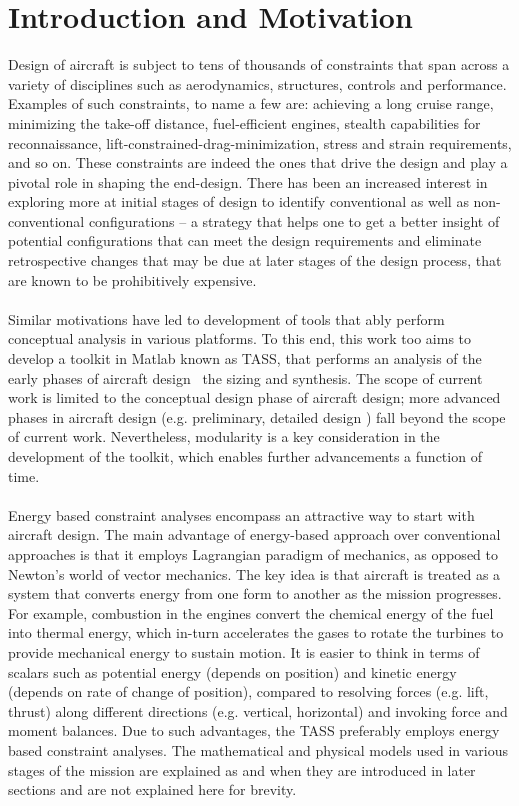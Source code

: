\documentclass[pdftex,11pt,letter]{article}
\begin{document}
\section{Introduction and Motivation}

Design of aircraft is subject to tens of thousands of constraints that span across a variety of disciplines such as aerodynamics, structures, controls and performance\cite{NicolaiText,FieldingText,HoweText,RaymerText}. Examples of such constraints, to name a few are: achieving a long cruise range, minimizing the take-off distance, fuel-efficient engines, stealth capabilities for reconnaissance, lift-constrained-drag-minimization, stress and strain requirements, and so on. These constraints are indeed the ones that drive the design and play a pivotal role in shaping the end-design. There has been an increased interest in exploring more at initial stages of design to identify conventional as well as non-conventional configurations -- a strategy that helps one to get a better insight of potential configurations that can meet the design requirements and eliminate retrospective changes that may be due at later stages of the design process, that are known to be prohibitively expensive. 
\\\\
Similar motivations have led to development of tools that ably perform conceptual analysis in various platforms\cite{Raymer2004, Kroo2005}. To this end, this work too aims to develop a toolkit in Matlab\cite{MATLAB} known as TASS, that performs an analysis of the early phases of aircraft design \ie~the sizing and synthesis. The scope of current work is limited to the conceptual design phase of aircraft design; more advanced phases in aircraft design (e.g. preliminary, detailed design \etc) fall beyond the scope of current work. Nevertheless, modularity is a key consideration in the development of the toolkit, which enables further advancements a function of time.
\\\\
Energy based constraint analyses encompass an attractive way to start with aircraft design. The main advantage of energy-based approach over conventional approaches is that it employs Lagrangian paradigm of mechanics, as opposed to Newton's world of vector mechanics. The key idea is that aircraft is treated as a system that converts energy from one form to another as the mission progresses. For example, combustion in the engines convert the chemical energy of the fuel into thermal energy, which in-turn accelerates the gases to rotate the turbines to provide mechanical energy to sustain motion. It is easier to think in terms of scalars such as potential energy (depends on position) and  kinetic energy (depends on rate of change of position), compared to resolving forces (e.g. lift, thrust)  along different directions (e.g. vertical, horizontal) and invoking force and moment balances. Due to such advantages, the \textsc{TASS} preferably employs energy based constraint analyses. The mathematical and physical models used in various stages of the mission are explained as and when they are introduced in later sections and are not explained here for brevity.
\end{document}
